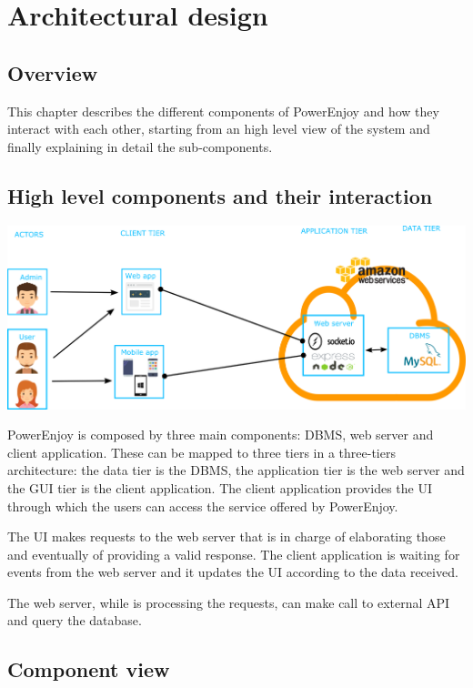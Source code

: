 \chapter{Architectural design}

\section{Overview}
This chapter describes the different components of PowerEnjoy and how they interact with each other, starting from an high level view of the system and finally explaining in detail the sub-components.

\section{High level components and their interaction}
\includegraphics[width=\textwidth, keepaspectratio]{../images/architectural_design/high_level_view.png}

PowerEnjoy is composed by three main components: DBMS, web server and client application.
These can be mapped to three tiers in a three-tiers architecture: the data tier is the DBMS, the application tier is the web server and the GUI tier is the client application.
The client application provides the UI through which the users can access the service offered by PowerEnjoy.

The UI makes requests to the web server that is in charge of elaborating those and eventually of providing a valid response.
The client application is waiting for events from the web server and it updates the UI according to the data received.

The web server, while is processing the requests, can make call to external API and query the database.

\section{Component view}

